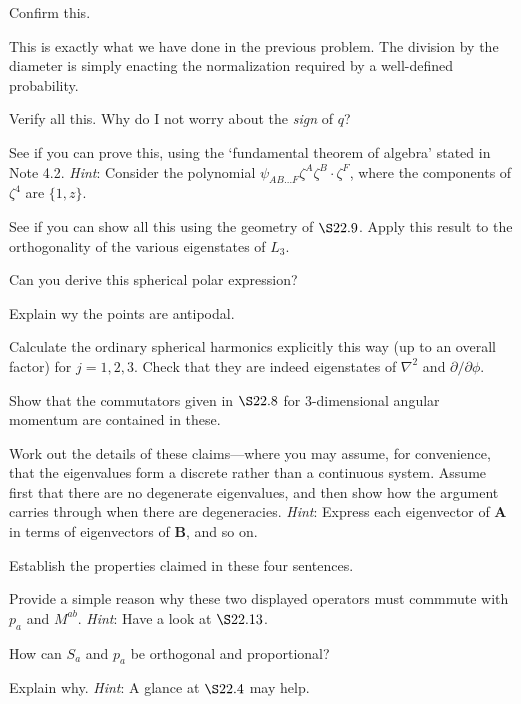 \documentclass[../road-to-reality.tex]{subfiles}
\begin{document}
\begin{questions}
\question Confirm this.

\begin{solution}
	This is exactly what we have done in the previous problem. The division by the diameter is simply enacting the normalization required by a well-defined probability.
\end{solution}

\question Verify all this. Why do I not worry about the \textit{sign} of $q$?

\question See if you can prove this, using the `fundamental theorem of algebra' stated in Note 4.2. \textit{Hint}: Consider the polynomial $\psi_{AB\dots F}\zeta^A\zeta^B\cdot\zeta^F$, where the components of $\zeta^4$ are $\{1, z\}$.

\question See if you can show all this using the geometry of $\S 22.9$. Apply this result to the orthogonality of the various eigenstates of $L_3$.

\question Can you derive this spherical polar expression?

\question Explain wy the points are antipodal.

\question Calculate the ordinary spherical harmonics explicitly this way (up to an overall factor) for $j = 1,2,3$. Check that they are indeed eigenstates of $\nabla^2$ and $\partial/\partial\phi$.

\question Show that the commutators given in $\S 22.8$ for $3$-dimensional angular momentum are contained in these.

\question Work out the details of these claims---where you may assume, for convenience, that the eigenvalues form a discrete rather than a continuous system. Assume first that there are no degenerate eigenvalues, and then show how the argument carries through when there are degeneracies. \textit{Hint}: Express each eigenvector of $\mathbf{A}$ in terms of eigenvectors of $\mathbf{B}$, and so on.

\question Establish the properties claimed in these four sentences.

\question Provide a simple reason why these two displayed operators must commmute with $p_a$ and $M^{ab}$. \textit{Hint}: Have a look at $\S 22.13$.

\question How can $S_a$ and $p_a$ be orthogonal and proportional?

\question Explain why. \textit{Hint}: A glance at $\S 22.4$ may help.

\end{questions}
	
\end{document}
